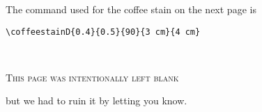 \documentclass[a4paper, 11pt, BCOR = 0 pt, oneside, english]{scrartcl}
\begin{document}
\begin{tcolorbox}
  The command used for the coffee stain on the next page is

  \verb|\coffeestainD{0.4}{0.5}{90}{3 cm}{4 cm}|
\end{tcolorbox}

\newpage{}
\pagestyle{empty}
~\\

\label{stainD}

\vfill{}
\begin{center}
\textsc{This page was intentionally left blank}

but we had to ruin it by letting you know.
\end{center}

\vfill{}
\end{document}
